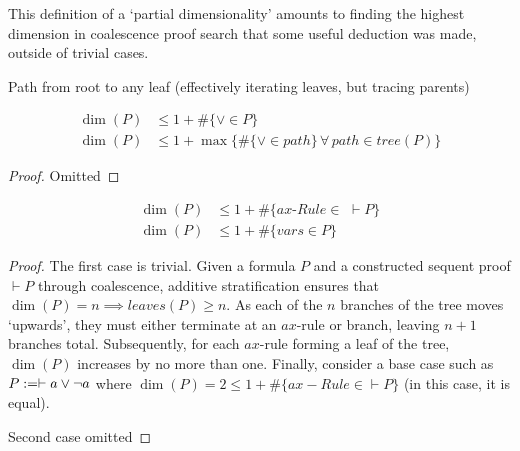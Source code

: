     \begin{remark}
        This definition of a `partial dimensionality' amounts to finding the highest dimension in coalescence proof search that some useful deduction was made, outside of trivial cases.
    \end{remark}


    \begin{definition}
        Path from root to any leaf (effectively iterating leaves, but tracing parents)
    \end{definition}


    \begin{proposition}
        \begin{align*}
            \dim(P) &\leq 1 + \#\{\vee \in P\} \\
            \dim(P) &\leq 1 + \max\{\#\{\vee \in path\} \, \forall \, path \in tree(P)\}
        \end{align*}
    \end{proposition}

    \begin{proof}
        Omitted
    \end{proof}


    \begin{proposition}
        \begin{align*}
            \dim(P) &\leq 1 + \#\{ax\textit{-Rule} \in \,\, \vdash P\} \\
            \dim(P) &\leq 1 + \#\{vars \in P\}
        \end{align*}
    \end{proposition}

    \begin{proof}
        The first case is trivial.
        Given a formula $P$ and a constructed sequent proof $\vdash P$ through coalescence, additive stratification ensures that $\dim(P) = n \implies leaves(P) \geq n$.
        As each of the $n$ branches of the tree moves `upwards', they must either terminate at an $ax$-rule or branch, leaving $n + 1$ branches total.
        Subsequently, for each $ax$-rule forming a leaf of the tree, $\dim(P)$ increases by no more than one.
        Finally, consider a base case such as $P := \vdash a \vee \neg a$ where $\dim(P) = 2 \leq 1 + \#\{ax-Rule \in \vdash P\}$ (in this case, it is equal).
        
        Second case omitted
    \end{proof}


